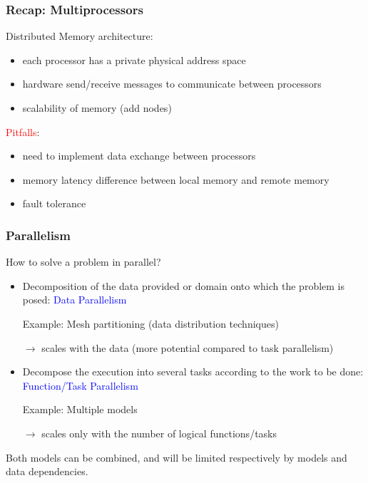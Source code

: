 \begin{frame}
  \frametitle{Recap: Multiprocessors}
Distributed Memory architecture:
\begin{itemize}
\item each processor has a private physical address space
\item hardware send/receive messages to communicate between processors
\item scalability of memory (add nodes)
\end{itemize}

\medskip
\textcolor{red}{Pitfalls}:
\begin{itemize}
\item need to implement data exchange between processors
\item memory latency difference between local memory and remote memory
\item fault tolerance
\end{itemize}
\end{frame}

\begin{frame}
  \frametitle{Parallelism}

How to solve a problem in parallel?

\medskip
\begin{itemize}

\item Decomposition of the data provided or domain onto which the problem is posed:
\textcolor{blue}{Data Parallelism}

\medskip
Example: Mesh partitioning (data distribution techniques)

\medskip
$\rightarrow$ scales with the data (more potential compared to task parallelism)

\vspace{2ex}
\item Decompose the execution into several tasks according to the work to be done: \textcolor{blue}{Function/Task Parallelism}

\medskip
Example: Multiple models


\medskip
$\rightarrow$ scales only with the number of logical functions/tasks

\end{itemize}

\medskip
Both models can be combined, and will be limited respectively by models and data dependencies.

\end{frame}

